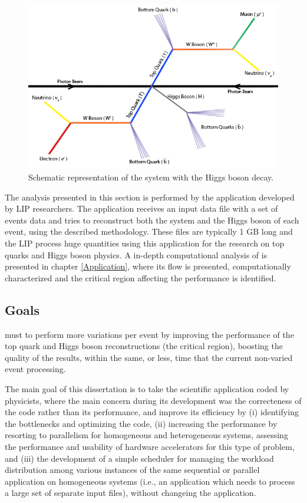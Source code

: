 \begin{figure}[!htp]
	\begin{center}
		\includegraphics[scale=0.6]{../../common/img/ttbar_higgs.png}
		\caption{Schematic representation of the \ttbar system with the Higgs boson decay.}
		\label{fig:HiggsBosonDecay}
	\end{center}
\end{figure}

The analysis presented in this section is performed by the \tth application developed by LIP researchers. The application receives an input data file with a set of events data and tries to reconstruct both the \ttbar system and the Higgs boson of each event, using the described methodology. These files are typically 1 GB long and the LIP process huge quantities using this application for the research on top quarks and Higgs boson physics. A in-depth computational analysis of \tth is presented in chapter \ref{Application}, where its flow is presented, computationally characterized and the critical region affecting the performance is identified.

\subsection{Goals}
\label{Goals}

\tth must to perform more variations per event by improving the performance of the top quark and Higgs boson reconstructions (the critical region), boosting the quality of the results, within the same, or less, time that the current non-varied event processing. 

The main goal of this dissertation is to take the \tth scientific application coded by physicists, where the main concern during its development was the correcteness of the code rather than its performance, and improve its efficiency by (i) identifying the bottlenecks and optimizing the code, (ii) increasing the performance by resorting to parallelism for homogeneous and heterogeneous systems, assessing the performance and usability of hardware accelerators for this type of problem, and (iii) the development of a simple scheduler for managing the workload distribution among various instances of the same sequential or parallel application on homogeneous systems (i.e., an application which needs to process a large set of separate input files), without changeing the application.

